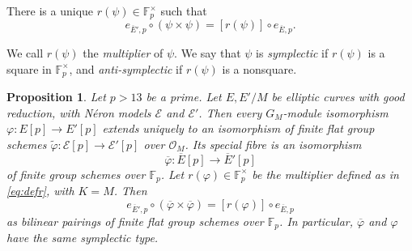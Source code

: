 \documentclass[12pt]{amsart}
\numberwithin{equation}{section}
\newtheorem{proposition}[equation]{Proposition}
\theoremstyle{definition}
\newcommand{\F}{\mathbb{F}}
\begin{document}
There is a unique $r(\psi)\in\F_p^\times$ such that
\[
    e_{\overline E',p}\circ(\psi\times\psi)
    =
    [r(\psi)]\circ e_{\overline E,p}.
\]

We call $r(\psi)$ the \emph{multiplier} of $\psi$. We say that $\psi$
is \emph{symplectic} if $r(\psi)$ is a square in $\F_p^\times$, and
\emph{anti-symplectic} if $r(\psi)$ is a nonsquare. 
\begin{proposition}
\label{prop:reduction}
Let \(p>13\) be a prime.
Let \(E,E'/M\) be elliptic curves with good reduction, with N\'eron models \(\mathcal{E}\) and \(\mathcal{E}'\). Then every \(G_M\)-module isomorphism
\(
\varphi:E[p]\to E'[p]
\)
extends uniquely to an isomorphism of finite flat group schemes
\(
\widetilde{\varphi}:\mathcal{E}[p]\to\mathcal{E}'[p]
\)
over \(\mathcal{O}_M\). Its special fibre is an isomorphism
\[
\overline{\varphi}:\overline{E}[p]\to\overline{E}'[p]
\]
of finite group schemes over \(\mathbb{F}_p\).
Let $r(\varphi)\in\F_p^\times$ be the multiplier defined as in
\eqref{eq:defr}, with $K=M$. Then
\[
    e_{\overline E',p}
    \circ
    (\overline\varphi\times\overline\varphi)
    =
    [r(\varphi)]\circ e_{\overline E,p}
\]
as bilinear pairings of finite flat group schemes over $\F_p$.
In particular, \(\overline{\varphi}\) and \(\varphi\) have the same symplectic type.
\end{proposition}
\end{document}
